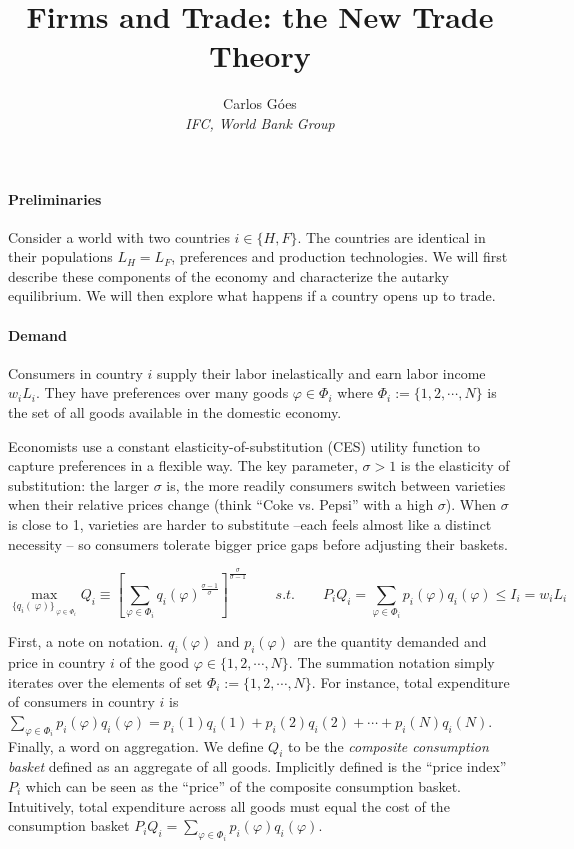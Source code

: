 \documentclass[11pt,letterpaper]{article}
\begin{document}
\title{\textbf{Firms and Trade: the New Trade Theory}}
\author{\large%
\setcounter{footnote}{0}%
Carlos G\'{o}es \\[-3pt] \textit{\small IFC, World Bank Group}
}
\maketitle

\paragraph{Preliminaries} Consider a world with two countries $i \in \{H,F \}$. The countries are identical in their populations $L_H=L_F$, preferences and production technologies. We will first describe these components of the economy and characterize the autarky equilibrium. We will then explore what happens if a country opens up to trade. 

\paragraph{Demand} Consumers in country $i$ supply their labor inelastically and earn labor income $w_i L_i$. They have preferences over many goods $\varphi \in \Phi_i$ where $\Phi_i := \{1,2,\cdots, N\}$ is the set of all goods available in the domestic economy.

Economists use a constant elasticity-of-substitution (CES) utility function to capture preferences in a flexible way. The key parameter,  $\sigma > 1$ is the elasticity of substitution: the larger $\sigma$ is, the more readily consumers switch between varieties when their relative prices change (think “Coke vs. Pepsi” with a high $\sigma$). When $\sigma$ is close to 1, varieties are harder to substitute --each feels almost like a distinct necessity -- so consumers tolerate bigger price gaps before adjusting their baskets.

\begin{equation*}
    \max_{\{q_i(\
\varphi)\}_{\
\varphi \in \Phi_i}} Q_i \equiv \left[ \sum_{\varphi \in \Phi_i } q_i(
\varphi)^{\tfrac{\sigma-1}{\sigma}} \right]^{\tfrac{\sigma}{\sigma-1} } \qquad s.t. \qquad  P_i Q_i =\sum_{\varphi \in \Phi_i } p_i(\varphi) q_i(\varphi) \le I_i = w_i L_i 
\end{equation*}

First, a note on notation. $q_i(\varphi)$ and $p_i(\varphi)$ are the quantity demanded and price in country $i$ of the good $\varphi \in \{1, 2, \cdots, N\}$. The summation notation simply iterates over the elements of set $\Phi_i:=\{1, 2, \cdots, N\}$. For instance,  total expenditure of consumers in country $i$ is  $\sum_{\varphi \in \Phi_i } p_i(\varphi) q_i(\varphi) = p_i(1) q_i(1) + p_i(2) q_i(2) + \cdots + p_i(N) q_i(N)$. Finally, a word on aggregation. We define $ Q_i$ to be the \textit{composite consumption basket}
defined as an aggregate of all goods. Implicitly defined is the ``price index'' $P_i$ which can be seen as the ``price'' of the composite consumption basket. Intuitively, total expenditure across all goods must equal the cost of the consumption basket $P_i Q_i =\sum_{\varphi \in \Phi_i } p_i(\varphi) q_i(\varphi)$.
\end{document}

